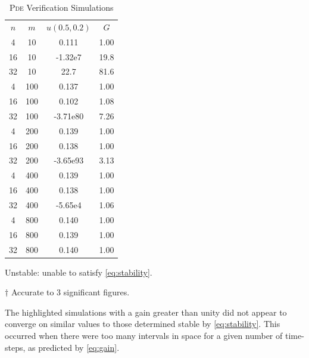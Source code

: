 \documentclass[a4paper,12pt,twocolumn]{article}
\begin{document}
\begin{table}[h]
    \centering
    \footnotesize
    \caption{\textsc{Pde} Verification Simulations}
    \label{table:pde}
    \begin{threeparttable}
        \begin{tabular}{
            @{\hspace{1em}}
            S[table-format=2]
            S[table-format=3]
            S[table-format=+2.2e2]
            S[table-format=2.2]
            @{\hspace{1em}}
        }
            \toprule
            {$n$} & {$m$} & {$u(0.5,0.2)$\tnote{$\dagger$}} & 
                {$G$\tnote{$\dagger$}}\\
            \cmidrule(rl){1-3}\cmidrule(rl){4-4}
             4 &  10 &  0.111   &  1.00 \\
            16 &  10 & -1.32e7  & 19.8  \\
            32 &  10 & 22.7     & 81.6  \\
             4 & 100 &  0.137   &  1.00 \\
            16 & 100 &  0.102   &  1.08 \\
            32 & 100 & -3.71e80 &  7.26 \\
             4 & 200 &  0.139   &  1.00 \\
            16 & 200 &  0.138   &  1.00 \\
            32 & 200 & -3.65e93 &  3.13 \\
             4 & 400 &  0.139   &  1.00 \\
            16 & 400 &  0.138   &  1.00 \\
            32 & 400 & -5.65e4  &  1.06 \\
             4 & 800 &  0.140   &  1.00 \\
            16 & 800 &  0.139   &  1.00 \\
            32 & 800 &  0.140   &  1.00 \\
            \bottomrule
        \end{tabular}
        \begin{tablenotes}
            \item\colorbox{red!20}{Unstable: unable to satisfy
                \eqref{eq:stability}.}
            \item[$\dagger$] Accurate to 3 significant figures.
        \end{tablenotes}
    \end{threeparttable}
\end{table}

The highlighted simulations with a gain greater than unity did not appear to
converge on similar values to those determined stable by \eqref{eq:stability}.
This occurred when there were too many intervals in space for a given number of
time-steps, as predicted by \eqref{eq:gain}.

\printbibliography
\end{document}
